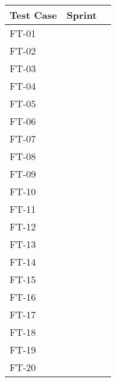 \begin{tabular}{| l | l | l |}
	\hline
	\rowcolor{lightgray}
	{\bf Test Case} & {\bf Sprint} \\ \hline
	FT-01 & \\ \hline
	FT-02 & \\ \hline
	FT-03 & \\ \hline
	FT-04 & \\ \hline
	FT-05 & \\ \hline
	FT-06 & \\ \hline
	FT-07 & \\ \hline
	FT-08 & \\ \hline
	FT-09 & \\ \hline
	FT-10 & \\ \hline
	FT-11 & \\ \hline
	FT-12 & \\ \hline
	FT-13 & \\ \hline
	FT-14 & \\ \hline
	FT-15 & \\ \hline
	FT-16 & \\ \hline
	FT-17 & \\ \hline
	FT-18 & \\ \hline
	FT-19 & \\ \hline
	FT-20 & \\
	\hline
\end{tabular}